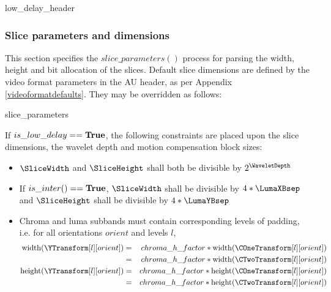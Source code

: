 \begin{pseudo}{low\_delay\_header}{}
\end{pseudo}

\subsubsection{Slice parameters and dimensions}
\label{sliceparams}

This section specifies the $slice\_parameters()$ process for parsing the width, height and bit allocation of 
the slices. Default slice dimensions are defined by the video format parameters in the AU header, as per Appendix 
\ref{videoformatdefaults}. They may be overridden as follows:

\begin{pseudo}{slice\_parameters}{}
\bsEND
{}
\bsEND
\end{pseudo}

If $is\_low\_delay==\text{\bf{True}}$, the following constraints are placed upon the slice dimensions, the wavelet depth
 and motion compensation block sizes:

\begin{itemize}
\item $\SliceWidth$ and $\SliceHeight$ shall both be divisible by $2^\WaveletDepth$
\item If $is\_inter()==\text{\bf{True}}$, $\SliceWidth$ shall be divisible by $4*\LumaXBsep$ and $\SliceHeight$ shall be divisible by $4*\LumaYBsep$
\item Chroma and luma subbands must contain corresponding levels of padding, i.e. for all orientations $orient$ and levels $l$,
\begin{eqnarray*}
\width(\YTransform[l][orient]) & = & chroma\_h\_factor*\width(\COneTransform[l][orient]) \\
& = & chroma\_h\_factor*\width(\CTwoTransform[l][orient]) \\
\height(\YTransform[l][orient]) & = & chroma\_h\_factor*\height(\COneTransform[l][orient]) \\
& = & chroma\_h\_factor*\height(\CTwoTransform[l][orient]) \\
\end{eqnarray*}
\end{itemize}

